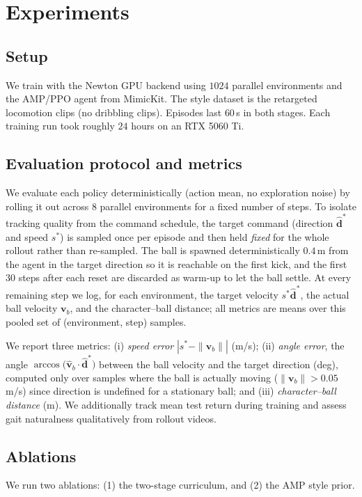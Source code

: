 \documentclass[10pt,twocolumn,letterpaper]{article}
\begin{document}
\section{Experiments}
\label{sec:experiments}

\subsection{Setup}
We train with the Newton GPU backend using $1024$ parallel environments and the
AMP/PPO agent from MimicKit. The style dataset is the retargeted locomotion
clips (no dribbling clips). Episodes last $60$\,s in both stages. Each training
run took roughly $24$ hours on an RTX 5060 Ti.

\subsection{Evaluation protocol and metrics}
\label{sec:eval}
We evaluate each policy deterministically (action mean, no exploration noise)
by rolling it out across $8$ parallel environments for a fixed number of steps.
To isolate tracking quality from the command schedule, the target command
(direction $\hat{\mathbf{d}}^*$ and speed $s^*$) is sampled once per episode and
then held \emph{fixed} for the whole rollout rather than re-sampled. The ball is
spawned deterministically $0.4$\,m from the agent in the target direction so it
is reachable on the first kick, and the first $30$ steps after each reset are
discarded as warm-up to let the ball settle. At every remaining step we log,
for each environment, the target velocity $s^*\hat{\mathbf{d}}^*$, the actual
ball velocity $\mathbf{v}_b$, and the character--ball distance; all metrics are
means over this pooled set of (environment, step) samples.

We report three metrics: (i) \emph{speed error} $|s^* - \|\mathbf{v}_b\||$
(m/s); (ii) \emph{angle error}, the angle
$\arccos\!\bigl(\hat{\mathbf{v}}_b \cdot \hat{\mathbf{d}}^*\bigr)$ between the
ball velocity and the target direction (deg), computed only over samples where
the ball is actually moving ($\|\mathbf{v}_b\| > 0.05$\,m/s) since direction is
undefined for a stationary ball; and (iii) \emph{character--ball distance} (m).
We additionally track mean test return during training and assess gait
naturalness qualitatively from rollout videos.

\subsection{Ablations}
We run two ablations: (1) the two-stage curriculum, and (2) the AMP style prior.
\end{document}
